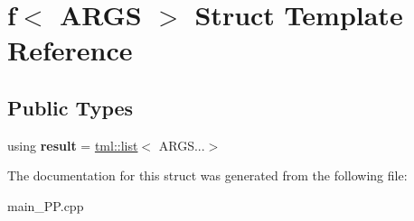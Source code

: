 \hypertarget{structf}{\section{f$<$ A\+R\+G\+S $>$ Struct Template Reference}
\label{structf}
}
\subsection*{Public Types}
\begin{DoxyCompactItemize}
\item 
\hypertarget{structf_a361f2749fa2f5fbb6dd02e6cb7c8dfe5}{using {\bfseries result} = \hyperlink{structtml_1_1list}{tml\+::list}$<$ A\+R\+G\+S...$>$}\label{structf_a361f2749fa2f5fbb6dd02e6cb7c8dfe5}

\end{DoxyCompactItemize}


The documentation for this struct was generated from the following file\+:\begin{DoxyCompactItemize}
\item 
main\+\_\+\+P\+P.\+cpp\end{DoxyCompactItemize}
